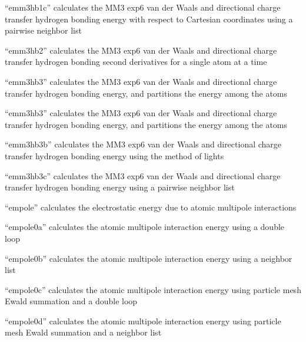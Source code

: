 \documentclass[letterpaper,11pt,english]{sphinxmanual}
\begin{document}
“emm3hb1c” calculates the MM3 exp\sphinxhyphen{}6 van der Waals and directional
charge transfer hydrogen bonding energy with respect to Cartesian
coordinates using a pairwise neighbor list


“emm3hb2” calculates the MM3 exp\sphinxhyphen{}6 van der Waals and directional
charge transfer hydrogen bonding second derivatives for a single
atom at a time


“emm3hb3” calculates the MM3 exp\sphinxhyphen{}6 van der Waals and directional
charge transfer hydrogen bonding energy, and partitions the energy
among the atoms


“emm3hb3” calculates the MM3 exp\sphinxhyphen{}6 van der Waals and
directional charge transfer hydrogen bonding energy, and
partitions the energy among the atoms


“emm3hb3b” calculates the MM3 exp\sphinxhyphen{}6 van der Waals and
directional charge transfer hydrogen bonding energy using
the method of lights


“emm3hb3c” calculates the MM3 exp\sphinxhyphen{}6 van der Waals and
directional charge transfer hydrogen bonding energy using
a pairwise neighbor list


“empole” calculates the electrostatic energy due to atomic
multipole interactions


“empole0a” calculates the atomic multipole interaction energy
using a double loop


“empole0b” calculates the atomic multipole interaction energy
using a neighbor list


“empole0c” calculates the atomic multipole interaction energy
using particle mesh Ewald summation and a double loop


“empole0d” calculates the atomic multipole interaction energy
using particle mesh Ewald summation and a neighbor list
\end{document}
